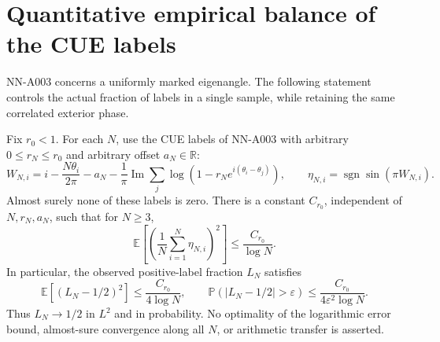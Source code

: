 \section{Quantitative empirical balance of the CUE labels}
\label{sec:analytic-cue-empirical-balance}

NN-A003 concerns a uniformly marked eigenangle. The following
statement controls the actual fraction of labels in a single
sample, while retaining the same correlated exterior phase.

\begin{theorem}
\label{thm:analytic-cue-empirical-balance}
Fix $r_0<1$. For each $N$, use the CUE labels of NN-A003 with
arbitrary $0\le r_N\le r_0$ and arbitrary offset $a_N\in\mathbb R$:
\[
 W_{N,i}=i-\frac{N\theta_i}{2\pi}-a_N
          -\frac1\pi\operatorname{Im}\sum_j
                   \log(1-r_Ne^{i(\theta_i-\theta_j)}),
 \qquad \eta_{N,i}=\operatorname{sgn}\sin(\pi W_{N,i}).
\]
Almost surely none of these labels is zero. There is a constant
$C_{r_0}$, independent of $N,r_N,a_N$, such that for $N\ge3$,
\begin{equation}\label{eq:analytic-cue-empirical-rate}
 \mathbb E\left[\left(\frac1N\sum_{i=1}^N\eta_{N,i}\right)^2\right]
                          \le\frac{C_{r_0}}{\log N}.
\end{equation}
In particular, the observed positive-label fraction $L_N$ satisfies
\[
 \mathbb E[(L_N-1/2)^2]\le\frac{C_{r_0}}{4\log N},\qquad
 \mathbb P(|L_N-1/2|>\varepsilon)
                   \le\frac{C_{r_0}}{4\varepsilon^2\log N}.
\]
Thus $L_N\to1/2$ in $L^2$ and in probability. No optimality of
the logarithmic error bound, almost-sure convergence along all
$N$, or arithmetic transfer is asserted.
\end{theorem}

